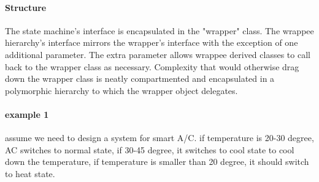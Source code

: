 \documentclass{book}
\begin{document}
\paragraph{Structure}
The state machine's interface is encapsulated in the "wrapper" class.
The wrappee hierarchy's interface mirrors the wrapper's interface with the exception of one additional parameter.
The extra parameter allows wrappee derived classes to call back to the wrapper class as necessary.
Complexity that would otherwise drag down the wrapper class is neatly compartmented and encapsulated in a polymorphic hierarchy to which the wrapper object delegates.

\begin{figure}[!h]
\begin{floatrow}
\end{floatrow}
\end{figure}

\paragraph{example 1} assume we need to design a system for smart A/C. if temperature is 20-30 degree, AC switches to normal state, if 30-45 degree, it switches to cool state to cool down the temperature,
if temperature is smaller than 20 degree, it should switch to heat state.
\end{document}
